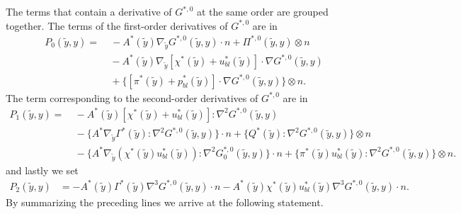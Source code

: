 \documentclass[11pt, reqno]{amsart}
\theoremstyle{definition}
\theoremstyle{remark}
\numberwithin{equation}{section}
\begin{document}
	
	\noindent The terms that contain a derivative of $G^{*,0}$ at the same order are grouped together. The terms of the first-order derivatives of $G^{*,0}$ are in
	\begin{align*}
		P_0	 (\tilde{y},y)=& \;-A^* (\tilde{y}) \nabla_{\tilde{y} } G^{*,0}(\tilde{y},y)\cdot n +\Pi^{*,0}(\tilde{y},y)\otimes n\\
		&\:- A^*(\tilde{y}) \nabla_{\!\tilde{y}}\left[\chi^* \left(\tilde{y} \right)+ u_{bl}^*\left(\tilde{y} \right)\right]\cdot \nabla G^{*,0}\left(\tilde{y},y\right)\\
		&\:+\{[\pi^*(\tilde{y})+p_{bl}^*(\tilde{y}) ] \cdot\nabla G^{*,0}(\tilde{y}, y)\}\otimes n.
	\end{align*}
	The term corresponding to the second-order derivatives of $G^{*,0}$ are in
	\begin{align*}
		P_1 (\tilde{y},y) =&\: -A^*(\tilde{y}) \left[\chi^* \left(\tilde{y} \right)+ u_{bl}^*\left(\tilde{y} \right)\right]: \nabla^2 G^{*,0}\left(\tilde{y},y\right)\\
		&\:-\{A^*  \nabla_{\tilde{y}} \Gamma^*(\tilde{y}) :\nabla^2 G^{*,0}(\tilde{y},y) \}\cdot n +\{ Q^*(\tilde{y}):\nabla^2 G^{*,0}(\tilde{y},y)\}\otimes n\\
		&\:-\{ A^*  \nabla_{\tilde{y} }  (\chi^*(\tilde{y}) u_{bl}^*(\tilde{y})): \nabla^2 G^{*,0}_0 (\tilde{y},y)\} \cdot n  +\{ \pi^* (\tilde{y})u_{bl}^*(\tilde{y}): \nabla^2 G^{*,0}(\tilde{y},y)\}\otimes n.
	\end{align*}
	and lastly we set
	\begin{align*}
		P_2(\tilde{y},y)	&= -A^*(\tilde{y})  \Gamma^*(\tilde{y}) \nabla^3 G^{*,0} (\tilde{y},y)\cdot n-A^*(\tilde{y})    \chi^* (\tilde{y})u_{bl}^*(\tilde{y}) \nabla^3 G^{*,0} (\tilde{y},y)\cdot n.
	\end{align*}
	By  summarizing the preceding lines we arrive at the following statement.
\end{document}
